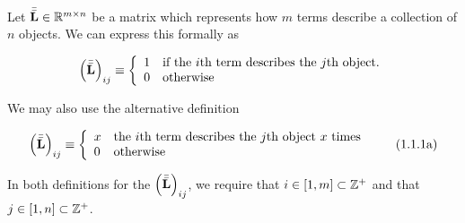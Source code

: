\documentclass[../ClusteringConnectionsMAIN.tex]{subfiles}
\begin{document}
\begin{flushleft}
\begin{large}

Let $\bar{\bar{\mathbf{L}}} \in \mathbb{R}^{m \times n}$ be a matrix which represents how $m$ terms describe a collection of $n$ objects.  We can express this formally as

\begin{align}
\left( \bar{\bar{\mathbf{L}}} \right)_{ij} \equiv \left\{
\begin{array}{l l}
1 & \text{if the $i$th term describes the $j$th object.} \\
0 & \text{otherwise}
\end{array}
\right.
\end{align}

We may also use the alternative definition

\begin{align}
\left( \bar{\bar{\mathbf{L}}} \right)_{ij} \equiv \left\{
\begin{array}{l l}
x & \text{the $i$th term describes the $j$th object $x$ times} \\
0 & \text{otherwise}
\end{array}
\right. \tag{1.1.1a}
\end{align}

In both definitions for the $\left( \bar{\bar{\mathbf{L}}} \right)_{ij}$, we require that $i \in \left[ 1, m \right] \subset \mathbb{Z}^+$ and that $j \in \left[ 1, n \right] \subset \mathbb{Z}^+$.

\end{large}
\end{flushleft}
\end{document}
